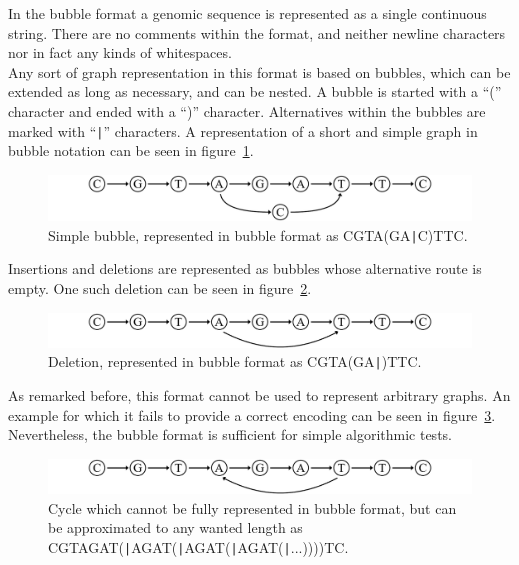 \documentclass[a4paper,12pt,twoside,BCOR=10mm]{scrbook}
\def\pipe{\texttt{|}}
\begin{document}
In the bubble format a genomic sequence is represented as a single continuous string.
There are no comments within the format,
and neither newline characters nor in fact any kinds of whitespaces. \\
Any sort of graph representation in this format is based on bubbles, which can be extended as long as necessary,
and can be nested. A bubble is started with a “(” character and ended
with a “)” character. Alternatives within the bubbles are marked with “{\!\pipe}”
characters.
A representation of a short and simple graph in bubble notation can be seen in figure~\ref{fig:evo_fig_STPUbubble_f}.

\begin{figure}[!htb]
\centering
\includegraphics[width=\textwidth]{evo_fig_STPUbubble_f.pdf}
\caption[Simple bubble in bubble format]{Simple bubble, represented in bubble format as \textup{CGTA(GA\pipe C)TTC}.} \label{fig:evo_fig_STPUbubble_f}
\end{figure}

Insertions and deletions are represented as bubbles whose alternative route is empty.
One such deletion can be seen in figure~\ref{fig:evo_fig_STPUinsertion_f}.

\begin{figure}[!htb]
\centering
\includegraphics[width=\textwidth]{evo_fig_STPUinsertion_f.pdf}
\caption[Deletion in bubble format]{Deletion, represented in bubble format as \textup{CGTA(GA\pipe )TTC}.} \label{fig:evo_fig_STPUinsertion_f}
\end{figure}

As remarked before, this format cannot be used to represent arbitrary graphs.
An example for which it fails to provide a correct encoding can be seen in figure~\ref{fig:evo_fig_STPUcycle_f}.
Nevertheless, the bubble format is sufficient for simple algorithmic tests.

\begin{figure}[!htb]
\centering
\includegraphics[width=\textwidth]{evo_fig_STPUcycle_f.pdf}
\caption[Cycle in bubble format]{Cycle which cannot be fully represented in bubble format, but can be approximated to any wanted length as \textup{CGTAGAT(\pipe AGAT(\pipe AGAT(\pipe AGAT(\pipe ...))))TC}.} \label{fig:evo_fig_STPUcycle_f}
\end{figure}
\end{document}
